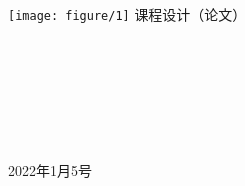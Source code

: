 \documentclass[12pt,oneside,a4paper,fleqn]{ctexart}
\begin{document}
    \begin{titlepage}
        
        \heiti
        \ 
        \vspace{3em}
        \begin{center}
            \texttt{[image: figure/1]}\newline
            {课程设计（论文）}\\
            \vspace{15em}
            \noindent{}\ \ \underline{}\\
            \vspace{1em}
            \ \ \underline{}\\
            \vspace{1em}
            \ \ \underline{}\\
            \vspace{1em}
            \ \ \underline{}\\
            \vspace{1em}
            \ \ \underline{}\\
            \vspace{1em}
            \ \ \underline{}\\
            \vspace{1em}
            \ \ \underline{}\\
            \vspace{10em}
            {2022年1月5号}
        \end{center}
    \end{titlepage}
\newpage

\begin{abstract}
    \songti
    \begin{spacing}{1.25}
        摘要又称概要、内容提要，意思是摘录要点或摘录下来的要点。 [1]  摘要是以提供文献内容梗概为目的，不加评论和补充解释，简明、确切地记述文献重要内容的短文。其基本要素包括研究目的、方法、结果和结论。具体地讲就是研究工作的主要对象和范围，采用的手段和方法，得出的结果和重要的结论，有时也包括具有情报价值的其它重要的信息。
        \newline
        \newline
        \textbf{关键字：}{$\times \times \times $}
    \end{spacing}
\end{abstract}
\end{document}
